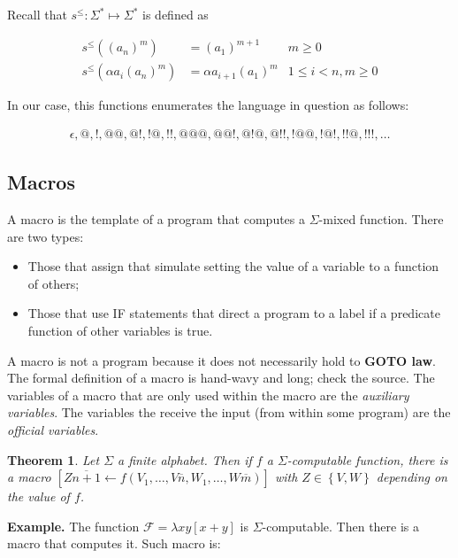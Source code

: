 \documentclass[a4paper, 12pt]{article}
\newtheorem{theorem}{Theorem}
\newtheorem{theorem}{Theorem}
\begin{document}
Recall that $s^{\leq} : \Sigma^{*} \mapsto \Sigma^{*}$ is defined as 

\begin{align*}
    s^{\leq} \left( (a_n)^m \right)  &= (a_1)^{m + 1} & m \geq 0\\ 
    s^{\leq} \left( \alpha a_i (a_n)^{m} \right) &= \alpha a_{i+1} (a_1)^{m} & 1
    \leq i < n, m \geq 0
\end{align*}

In our case, this functions enumerates the language in question as follows: 

\begin{align*}
    \epsilon, @, !, @ @, @ !, !@, !!, @@@, @@!, @!@, @!!, !@@, !@!, !!@, !!!, \ldots
\end{align*}

\subsection{Macros}

A macro is the template of a program that computes a $\Sigma$-mixed function.
There are two types: 

\begin{itemize}
    \item Those that assign that simulate setting the value of a variable to a
        function of others; 
    \item Those that use IF statements that direct a program to a label if a
        predicate function of other variables is true.
\end{itemize}

A macro is not a program because it does not necessarily hold to \textbf{GOTO
law}. The formal definition of a macro is hand-wavy and long; check the source.
The variables of a macro that are only used within the macro are the
\textit{auxiliary variables}. The variables the receive the input (from within
some program) are the \textit{official variables}. 

\begin{theorem}
    Let $\Sigma$ a finite alphabet. Then if $f$ a $\Sigma$-computable function,
    there is a macro $\left[ Z \overline{n+1} \leftarrow f \left( V_1, \ldots, V
    \overline{n}, W_1, \ldots, W \overline{m}\right)  \right] $ with $Z \in
    \left\{ V, W \right\} $ depending on the value of $f$.
\end{theorem}

\textbf{Example.} The function $\mathcal{F} = \lambda xy[x + y]$ is
$\Sigma$-computable. Then there is a macro that computes it. Such macro is: 
\end{document}
